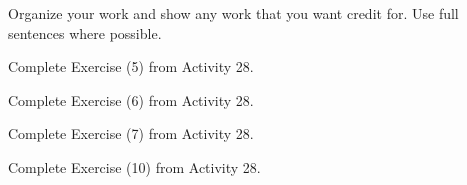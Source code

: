 \documentclass[addpoints]{exam}
\begin{document}
Organize your work and show any work that you want credit for. Use full sentences where possible.

\begin{questions}
\question 
Complete Exercise (5) from Activity 28.

\question 
Complete Exercise (6) from Activity 28.

\question 
Complete Exercise (7) from Activity 28.

\question 
Complete Exercise (10) from Activity 28.






\end{questions}
\end{document}
